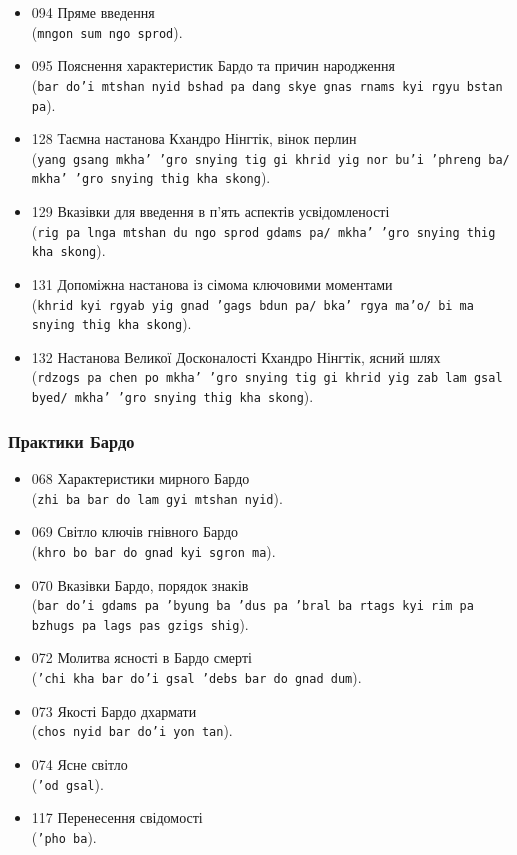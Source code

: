\documentclass{article}
\begin{document}
\begin{itemize}
\item 094 Пряме введення \\ (\texttt{mngon sum ngo sprod}).
\item 095 Пояснення характеристик Бардо та причин народження \\ (\texttt{bar do'i mtshan nyid bshad pa dang skye gnas rnams kyi rgyu bstan pa}).
\item 128 Таємна настанова Кхандро Нінгтік, вінок перлин \\ (\texttt{yang gsang mkha' 'gro snying tig gi khrid yig nor bu'i 'phreng ba/ mkha' 'gro snying thig kha skong}).
\item 129 Вказівки для введення в п’ять аспектів усвідомленості \\ (\texttt{rig pa lnga mtshan du ngo sprod gdams pa/ mkha' 'gro snying thig kha skong}).
\item 131 Допоміжна настанова із сімома ключовими моментами \\ (\texttt{khrid kyi rgyab yig gnad 'gags bdun pa/ bka' rgya ma'o/ bi ma snying thig kha skong}).
\item 132 Настанова Великої Досконалості Кхандро Нінгтік, ясний шлях \\ (\texttt{rdzogs pa chen po mkha' 'gro snying tig gi khrid yig zab lam gsal byed/ mkha' 'gro snying thig kha skong}).
\end{itemize}
\endgroup

\subsubsection{Практики Бардо}

\begingroup\raggedright
\begin{itemize}
\item 068 Характеристики мирного Бардо \\ (\texttt{zhi ba bar do lam gyi mtshan nyid}).
\item 069 Світло ключів гнівного Бардо \\ (\texttt{khro bo bar do gnad kyi sgron ma}).
\item 070 Вказівки Бардо, порядок знаків \\ (\texttt{bar do'i gdams pa 'byung ba 'dus pa 'bral ba rtags kyi rim pa bzhugs pa lags pas gzigs shig}).
\item 072 Молитва ясності в Бардо смерті \\ (\texttt{'chi kha bar do'i gsal 'debs bar do gnad dum}).
\item 073 Якості Бардо дхармати \\ (\texttt{chos nyid bar do'i yon tan}).
\item 074 Ясне світло \\ (\texttt{'od gsal}).
\item 117 Перенесення свідомості \\ (\texttt{'pho ba}).
\end{itemize}
\endgroup
\end{document}
